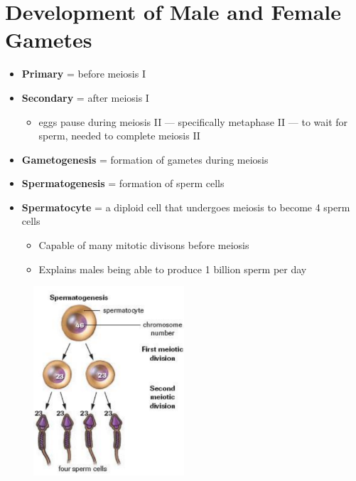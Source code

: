 \documentclass[a4paper,12pt]{article}
\begin{document}
\section{Development of \male\! Male and \female\! Female Gametes}
\begin{itemize}
    \item{\textbf{Primary} = before meiosis I}
    \item{
            \textbf{Secondary} = after meiosis I
            \begin{itemize}
                \item{eggs pause during meiosis II --- specifically metaphase II --- to wait for sperm, needed to complete meiosis II}
            \end{itemize}
        }
    \item{\textbf{Gametogenesis} = formation of gametes during meiosis}
    \item{\textbf{Spermatogenesis} = formation of sperm cells}
    \item{
            \textbf{Spermatocyte} = a diploid cell that undergoes meiosis to become 4 sperm cells
            \begin{itemize}
                \item{Capable of many mitotic divisons before meiosis}
                \item{Explains males being able to produce 1 billion sperm per day}
            \end{itemize}
        }
\end{itemize}

\begin{figure}[H]
    \centering
    \includegraphics[width=0.5\textwidth]{spermatogenesis}
\end{figure}
\end{document}
